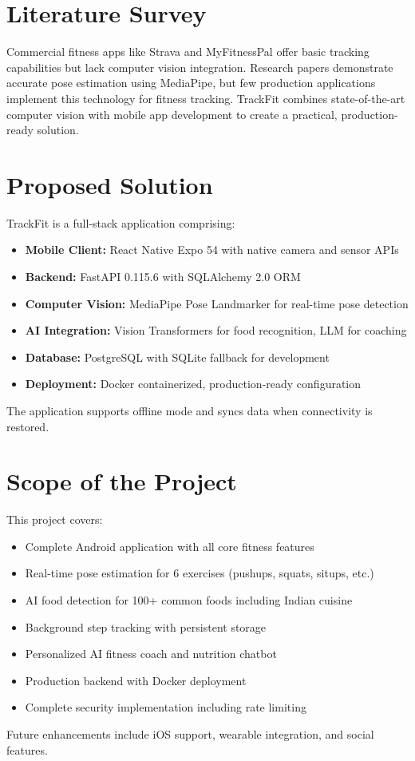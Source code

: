 \documentclass[12pt]{report}
\begin{document}
\section{Literature Survey}
Commercial fitness apps like Strava and MyFitnessPal offer basic tracking capabilities but lack computer vision integration. Research papers demonstrate accurate pose estimation using MediaPipe, but few production applications implement this technology for fitness tracking. TrackFit combines state-of-the-art computer vision with mobile app development to create a practical, production-ready solution.

\section{Proposed Solution}
TrackFit is a full-stack application comprising:
\begin{itemize}
    \item \textbf{Mobile Client:} React Native Expo 54 with native camera and sensor APIs
    \item \textbf{Backend:} FastAPI 0.115.6 with SQLAlchemy 2.0 ORM
    \item \textbf{Computer Vision:} MediaPipe Pose Landmarker for real-time pose detection
    \item \textbf{AI Integration:} Vision Transformers for food recognition, LLM for coaching
    \item \textbf{Database:} PostgreSQL with SQLite fallback for development
    \item \textbf{Deployment:} Docker containerized, production-ready configuration
\end{itemize}
The application supports offline mode and syncs data when connectivity is restored.

\section{Scope of the Project}
This project covers:
\begin{itemize}
    \item Complete Android application with all core fitness features
    \item Real-time pose estimation for 6 exercises (pushups, squats, situps, etc.)
    \item AI food detection for 100+ common foods including Indian cuisine
    \item Background step tracking with persistent storage
    \item Personalized AI fitness coach and nutrition chatbot
    \item Production backend with Docker deployment
    \item Complete security implementation including rate limiting
\end{itemize}
Future enhancements include iOS support, wearable integration, and social features.
\end{document}
